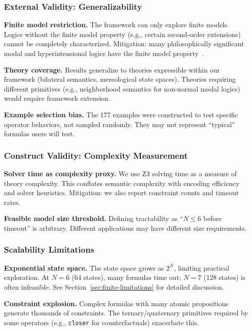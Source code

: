 \documentclass[pdflatex,sn-mathphys-num]{sn-jnl}
\newcommand{\zcloser}{\texttt{closer}}
\theoremstyle{thmstyleone}
\theoremstyle{thmstyletwo}
\theoremstyle{thmstylethree}
\begin{document}
\subsubsection{External Validity: Generalizability}

\textbf{Finite model restriction.}
The framework can only explore finite models.
Logics without the finite model property (e.g., certain second-order extensions) cannot be completely characterized.
Mitigation: many philosophically significant modal and hyperintensional logics have the finite model property~\cite{knudstorp2023}.

\textbf{Theory coverage.}
Results generalize to theories expressible within our framework (bilateral semantics, mereological state spaces).
Theories requiring different primitives (e.g., neighborhood semantics for non-normal modal logics) would require framework extension.

\textbf{Example selection bias.}
The 177 examples were constructed to test specific operator behaviors, not sampled randomly.
They may not represent ``typical'' formulas users will test.

\subsubsection{Construct Validity: Complexity Measurement}

\textbf{Solver time as complexity proxy.}
We use Z3 solving time as a measure of theory complexity.
This conflates semantic complexity with encoding efficiency and solver heuristics.
Mitigation: we also report constraint counts and timeout rates.

\textbf{Feasible model size threshold.}
Defining tractability as ``$N \leq 6$ before timeout'' is arbitrary.
Different applications may have different size requirements.

\subsubsection{Scalability Limitations}

\textbf{Exponential state space.}
The state space grows as $2^N$, limiting practical exploration.
At $N=6$ (64 states), many formulas time out; $N=7$ (128 states) is often infeasible.
See Section~\ref{sec:finite-limitations} for detailed discussion.

\textbf{Constraint explosion.}
Complex formulas with many atomic propositions generate thousands of constraints.
The ternary/quaternary primitives required by some operators (e.g., \zcloser{} for counterfactuals) exacerbate this.
\end{document}
